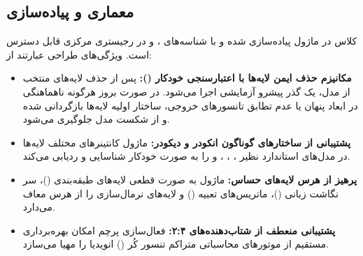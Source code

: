 \subsection{معماری و پیاده‌سازی}
کلاس  در ماژول  پیاده‌سازی شده و با شناسه‌های ،  و  در رجیستری مرکزی قابل دسترس است. ویژگی‌های طراحی عبارتند از:
\begin{itemize}
    \item \textbf{مکانیزم حذف ایمن لایه‌ها با اعتبارسنجی خودکار ():} پس از حذف لایه‌های منتخب از مدل، یک گذر پیشرو آزمایشی اجرا می‌شود. در صورت بروز هرگونه ناهماهنگی در ابعاد پنهان یا عدم تطابق تانسورهای خروجی، ساختار اولیه لایه‌ها بازگردانی شده و از شکست مدل جلوگیری می‌شود.
    \item \textbf{پشتیبانی از ساختارهای گوناگون انکودر و دیکودر:} ماژول کانتینرهای مختلف لایه‌ها در مدل‌های استاندارد نظیر ، ، ،  و  را به صورت خودکار شناسایی و ردیابی می‌کند.
    \item \textbf{پرهیز از هرس لایه‌های حساس:} ماژول به صورت قطعی لایه‌های طبقه‌بندی ()، سر نگاشت زبانی ()، ماتریس‌های تعبیه () و لایه‌های نرمال‌سازی را از هرس معاف می‌دارد.
    \item \textbf{پشتیبانی منعطف از شتاب‌دهنده‌های ۲:۴:} فعال‌سازی پرچم  امکان بهره‌برداری مستقیم از موتورهای محاسباتی متراکم تنسور کُر () انویدیا را مهیا می‌سازد.
\end{itemize}
